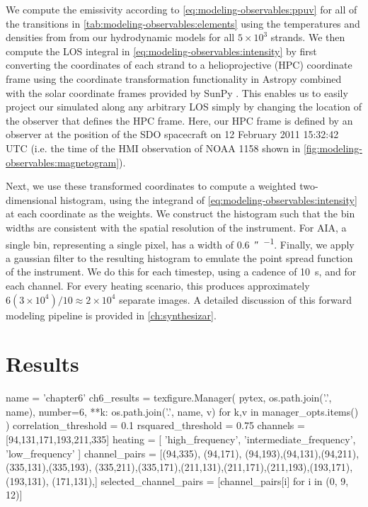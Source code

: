 We compute the emissivity according to \autoref{eq:modeling-observables:ppuv} for all of the transitions in \autoref{tab:modeling-observables:elements} using the temperatures and densities from from our hydrodynamic models for all $5\times10^3$ strands. We then compute the LOS integral in \autoref{eq:modeling-observables:intensity} by first converting the coordinates of each strand to a helioprojective (HPC) coordinate frame \citep[see][]{thompson_coordinate_2006} using the coordinate transformation functionality in Astropy \citep{the_astropy_collaboration_astropy_2018} combined with the solar coordinate frames provided by SunPy \citep{sunpy_community_sunpypython_2015}. This enables us to easily project our simulated \AR{} along any arbitrary LOS simply by changing the location of the observer that defines the HPC frame. Here, our HPC frame is defined by an observer at the position of the SDO spacecraft on 12 February 2011 15:32:42 UTC (i.e. the time of the HMI observation of NOAA 1158 shown in \autoref{fig:modeling-observables:magnetogram}).

Next, we use these transformed coordinates to compute a weighted two-dimensional histogram, using the integrand of \autoref{eq:modeling-observables:intensity} at each coordinate as the weights. We construct the histogram such that the bin widths are consistent with the spatial resolution of the instrument. For AIA, a single bin, representing a single pixel, has a width of \SI{0.6}{\arcsecond\per\pixel}. Finally, we  apply a gaussian filter to the resulting histogram to emulate the point spread function of the instrument. We do this for each timestep, using a cadence of \SI{10}{\second}, and for each channel. For every heating scenario, this produces approximately $6(3\times10^4)/10\approx2\times10^4$ separate images. A detailed discussion of this forward modeling pipeline is provided in \autoref{ch:synthesizar}.


\section{Results}\label{sec:modeling-observables:results}

\begin{pycode}
name = 'chapter6'
ch6_results = texfigure.Manager(
    pytex,
    os.path.join('.', name),
    number=6,
    **{k: os.path.join('.', name, v) for k,v in manager_opts.items()}
)
correlation_threshold = 0.1
rsquared_threshold = 0.75
channels = [94,131,171,193,211,335]
heating = [ 'high_frequency', 'intermediate_frequency', 'low_frequency' ]
channel_pairs = [(94,335), (94,171), (94,193),(94,131),(94,211),(335,131),(335,193),
				 (335,211),(335,171),(211,131),(211,171),(211,193),(193,171),(193,131),
				 (171,131),]
selected_channel_pairs = [channel_pairs[i] for i in (0, 9, 12)]
\end{pycode}

